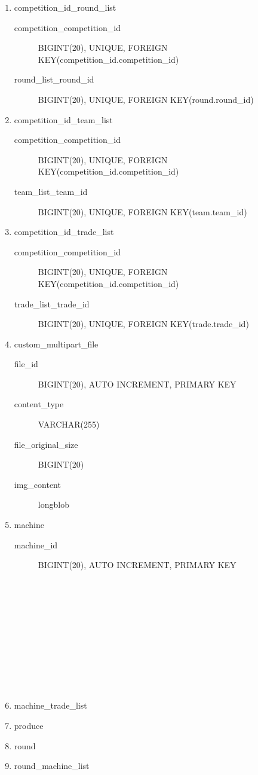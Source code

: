\documentclass{article}
\begin{document}
{\begin{enumerate}
  \item competition\_id\_round\_list
    \begin{description}
      \item[competition\_competition\_id] BIGINT(20), UNIQUE, FOREIGN KEY(competition\_id.competition\_id)
      \item[round\_list\_round\_id] BIGINT(20), UNIQUE, FOREIGN KEY(round.round\_id)
    \end{description}
  \item competition\_id\_team\_list
    \begin{description}
      \item[competition\_competition\_id] BIGINT(20), UNIQUE, FOREIGN KEY(competition\_id.competition\_id)
      \item[team\_list\_team\_id] BIGINT(20), UNIQUE, FOREIGN KEY(team.team\_id)
    \end{description}
  \item competition\_id\_trade\_list
    \begin{description}
      \item[competition\_competition\_id] BIGINT(20), UNIQUE, FOREIGN KEY(competition\_id.competition\_id)
      \item[trade\_list\_trade\_id] BIGINT(20), UNIQUE, FOREIGN KEY(trade.trade\_id)
    \end{description}
  \item custom\_multipart\_file
    \begin{description}
      \item[file\_id] BIGINT(20), AUTO INCREMENT, PRIMARY KEY
      \item[content\_type] VARCHAR(255)
      \item[file\_original\_size] BIGINT(20)
      \item[img_content] longblob
    \end{description}
  \item machine
    \begin{description}
      \item[machine\_id] BIGINT(20), AUTO INCREMENT, PRIMARY KEY
      \item[] 
      \item[] 
      \item[] 
    \end{description}
  \item machine\_trade\_list
  \item produce
  \item round
  \item round\_machine\_list

\end{enumerate}}
\end{document}
